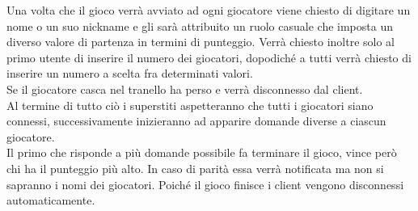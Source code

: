 \documentclass[a4paper,12pt]{report}
\begin{document}
    Una volta che il gioco verrà avviato ad ogni giocatore viene chiesto di digitare un nome o un suo nickname e gli sarà attribuito un ruolo casuale che imposta un diverso valore di partenza in termini di punteggio. 
    Verrà chiesto inoltre solo al primo utente di inserire il numero dei giocatori, dopodiché a tutti verrà chiesto di inserire un numero a scelta fra determinati valori. \\
    Se il giocatore casca nel tranello ha perso e verrà disconnesso dal client. \\
    Al termine di tutto ciò i superstiti aspetteranno che tutti i giocatori siano connessi, successivamente inizieranno ad apparire domande diverse a ciascun giocatore. \\
    Il primo che risponde a più domande possibile fa terminare il gioco, vince però chi ha il punteggio più alto. In caso di parità essa verrà notificata ma non si sapranno i nomi dei giocatori. Poiché il gioco finisce i client vengono disconnessi automaticamente.
\end{document}

